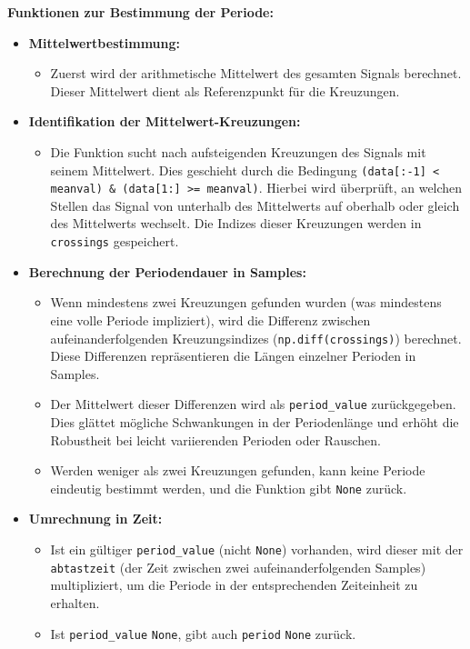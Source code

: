 \documentclass[a4paper, portrait, 12pt]{scrartcl} %
\begin{document}
\textbf{Funktionen zur Bestimmung der Periode:}
\begin{itemize}
    \item \textbf{Mittelwertbestimmung:}
    \begin{itemize}
        \item Zuerst wird der arithmetische Mittelwert des gesamten Signals berechnet. Dieser Mittelwert dient als Referenzpunkt für die Kreuzungen.
    \end{itemize}

    \item \textbf{Identifikation der Mittelwert-Kreuzungen:}
    \begin{itemize}
        \item Die Funktion sucht nach aufsteigenden Kreuzungen des Signals mit seinem Mittelwert. Dies geschieht durch die Bedingung \texttt{(data[:-1] < meanval) \& (data[1:] >= meanval)}. Hierbei wird überprüft, an welchen Stellen das Signal von unterhalb des Mittelwerts auf oberhalb oder gleich des Mittelwerts wechselt. Die Indizes dieser Kreuzungen werden in \texttt{crossings} gespeichert.
    \end{itemize}

    \item \textbf{Berechnung der Periodendauer in Samples:}
    \begin{itemize}
        \item Wenn mindestens zwei Kreuzungen gefunden wurden (was mindestens eine volle Periode impliziert), wird die Differenz zwischen aufeinanderfolgenden Kreuzungsindizes (\texttt{np.diff(crossings)}) berechnet. Diese Differenzen repräsentieren die Längen einzelner Perioden in Samples.
        \item Der Mittelwert dieser Differenzen wird als \texttt{period\_value} zurückgegeben. Dies glättet mögliche Schwankungen in der Periodenlänge und erhöht die Robustheit bei leicht variierenden Perioden oder Rauschen.
        \item Werden weniger als zwei Kreuzungen gefunden, kann keine Periode eindeutig bestimmt werden, und die Funktion gibt \texttt{None} zurück.
    \end{itemize}

    \item \textbf{Umrechnung in Zeit:}
    \begin{itemize}
        \item Ist ein gültiger \texttt{period\_value} (nicht \texttt{None}) vorhanden, wird dieser mit der \texttt{abtastzeit} (der Zeit zwischen zwei aufeinanderfolgenden Samples) multipliziert, um die Periode in der entsprechenden Zeiteinheit zu erhalten.
        \item Ist \texttt{period\_value} \texttt{None}, gibt auch \texttt{period} \texttt{None} zurück.
    \end{itemize}
\end{itemize}
\end{document}
